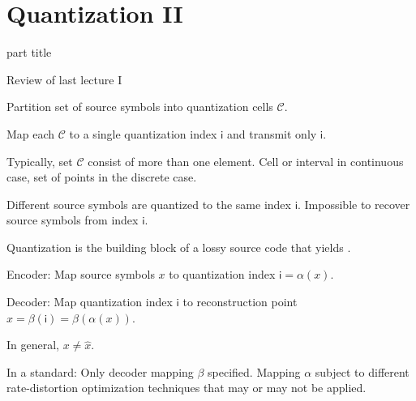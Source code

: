 
\DeclareMathOperator{\cwd}{codeword}
\newtheorem{proposition}{Proposition}
\usepackage{forest}
\usepackage{lipsum}
\usepackage{subcaption}
\usepackage{mathtools}







\section{Quantization II} 
\begin{frame}
 \vspace{12.0ex}
\begin{center}
\begin{beamercolorbox}[sep=12pt,center]{part title}
\insertsection\par
\end{beamercolorbox}
\end{center}
\end{frame}

\begin{frame}{Review of last lecture I}
\bit
\item Partition set of source symbols into quantization cells $\mathcal{C}$. 
\item Map each $\mathcal{C}$ to a single quantization index $\mathsf{i}$ and transmit only $\mathsf{i}$. 
\item Typically, set $\mathcal{C}$ consist of more than one element. Cell or interval in continuous case, set of points in 
the discrete case. 
\item [\iarrow] Different source symbols are quantized to the same index $\mathsf{i}$. Impossible to recover source symbols from index $\mathsf{i}$.
\item [\iarrow] Quantization is the building block of a lossy source code that yields .
\eit
{}
\bit
\item Encoder: Map source symbols $x$ to quantization index $\mathsf{i}=\alpha(x)$.
\item Decoder: Map quantization index $\mathsf{i}$ to reconstruction point $\hat{x}=\beta(\mathsf{i})=\beta(\alpha(x))$.
\item In general, $x\neq \hat{x}$.
\item In a standard: Only decoder mapping $\beta$ specified. Mapping $\alpha$ subject to different rate-distortion optimization techniques that 
may or may not be applied. 
\eit
\end{frame}

